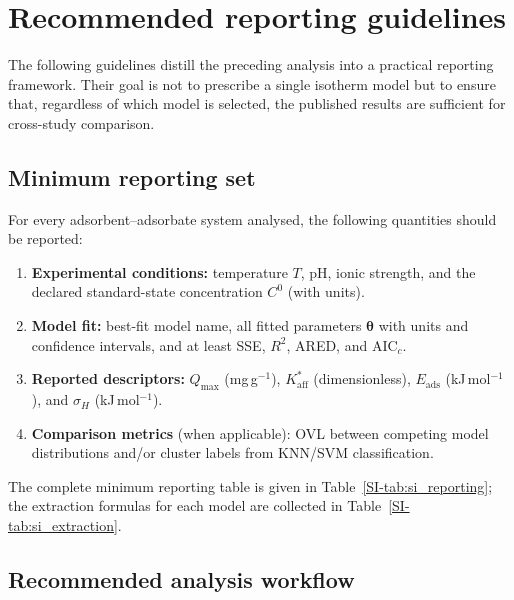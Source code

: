 \documentclass[journal=jacsat,manuscript=article]{achemso}
\begin{document}
	\section{Recommended reporting guidelines}
	\label{sec:guidelines}

	The following guidelines distill the preceding analysis into a practical reporting framework. Their goal is not to prescribe a single isotherm model but to ensure that, regardless of which model is selected, the published results are sufficient for cross-study comparison.

	\subsection{Minimum reporting set}
	\label{sec:min_reporting}

	For every adsorbent--adsorbate system analysed, the following quantities should be reported:
	\begin{enumerate}
		\item \textbf{Experimental conditions:} temperature $T$, pH, ionic strength, and the declared standard-state concentration $C^{0}$ (with units).
		\item \textbf{Model fit:} best-fit model name, all fitted parameters $\boldsymbol{\theta}$ with units and confidence intervals, and at least SSE, $R^2$, ARED, and AIC$_c$.
		\item \textbf{Reported descriptors:} $Q_{\max}$ (mg\,g$^{-1}$), $K_{\mathrm{aff}}^{\ast}$ (dimensionless), $E_{\mathrm{ads}}$ (kJ\,mol$^{-1}$), and $\sigma_H$ (kJ\,mol$^{-1}$).
		\item \textbf{Comparison metrics} (when applicable): OVL between competing model distributions and/or cluster labels from KNN/SVM classification.
	\end{enumerate}
	The complete minimum reporting table is given in Table~\ref{SI-tab:si_reporting}; the extraction formulas for each model are collected in Table~\ref{SI-tab:si_extraction}.

	\subsection{Recommended analysis workflow}
	\label{sec:workflow}
\end{document}
